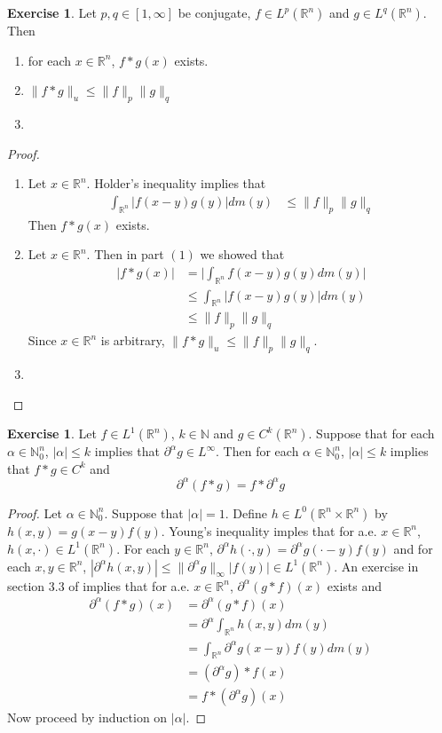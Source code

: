 \documentclass[12pt]{amsart}
\theoremstyle{definition}
\newtheorem{ex}[definition]{Exercise}
\newcommand{\p}{\partial}
\newcommand{\al}{\alpha}
\newcommand{\N}{\mathbb{N}}
\newcommand{\R}{\mathbb{R}}
\newcommand{\lex}[1]{\label{ex:#1}}
\begin{document}
	\begin{ex}
	\lex{205} Let $p, q \in [1, \infty]$ be conjugate, $f \in L^p(\R^n)$ and $g \in L^q(\R^n)$. Then 
	\begin{enumerate}
	\item for each $x \in \R^n$, $f * g(x)$ exists. 
	\item $\|f*g\|_u \leq \|f\|_p \|g\|_q $
	\item 
	\end{enumerate}
	\end{ex}
	
	\begin{proof}
	\begin{enumerate}
	\item Let $x \in \R^n$. Holder's inequality implies that 
	\begin{align*}
	\int_{\R^n}|f(x-y)g(y)| dm(y) 
	& \leq \|f\|_p \|g\|_q 
	\end{align*}
	Then $f*g(x)$ exists. 
	\item Let $x \in \R^n$. Then in part $(1)$ we showed that  
	\begin{align*}
	|f*g(x)| 
	&= \bigg| \int_{\R^n} f(x - y)g(y) dm(y)\bigg| \\
	&\leq  \int_{\R^n} |f(x-y)g(y)| dm(y) \\
	& \leq \|f\|_p \|g\|_q
	\end{align*}
	Since $x \in \R^n$ is arbitrary, $\|f*g\|_u \leq \|f\|_p \|g\|_q $.
	\item 
	\end{enumerate}
	\end{proof}
	
	\begin{ex}
	\lex{206} Let $f \in L^1(\R^n)$, $k \in \N$ and $g \in C^k(\R^n)$. Suppose that for each $\al \in \N_0^n$, $|\al| \leq k$ implies that $\p^{\al} g \in L^{\infty}$. Then for each $\al \in \N_0^n$, $|\al| \leq k$ implies that $f *  g \in C^{k}$ and $$\p^{\al}(f*g) = f*\p^{\al}g$$
	\end{ex}
	
	\begin{proof}
	Let $\al \in \N_0^n$. Suppose that $|\al| = 1$. Define $h \in L^0(\R^n \times \R^n)$ by $h(x,y) = g(x-y)f(y)$. Young's inequality imples that for a.e. $ x \in \R^n$, $h(x, \cdot) \in L^1(\R^n)$. For each $y \in \R^n$, $\p^{\al} h (\cdot,y) = \p^{\al}g(\cdot -y)f(y)$ and for each $x,y \in \R^n$, $|\p^{\al} h (x,y)| \leq \|\p^{\al} g\|_{\infty}|f(y)| \in L^1(\R^n)$. An exercise in section $3.3$ of 
	\cite{measure}
	implies that for a.e. $x \in \R^n$, $\p^{\al} (g*f)(x)$ exists and 
	\begin{align*}
	\p^{\al} (f*g)(x) 
	&= \p^{\al} (g * f)(x) \\
	&= \p^{\al}\int_{\R^n} h(x,y) dm(y) \\
	&= \int_{\R^n} \p^{\al} g(x -y)f(y) dm(y) \\
	&= (\p^{\al} g) * f (x) \\
	&=  f * (\p^{\al} g) (x)   
	\end{align*}	 
	Now proceed by induction on $|\al|$.
	\end{proof}
	
\end{document}
